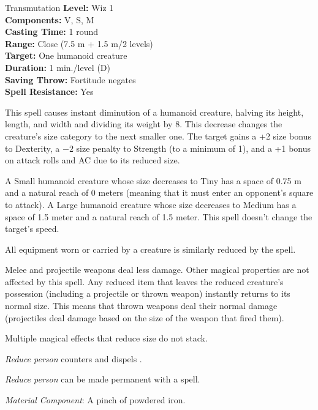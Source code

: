 {Transmutation}
{
	\textbf{Level:}
	Wiz 1\\
	\textbf{Components:}
	V, S, M\\
	\textbf{Casting Time:}
	1 round\\
	\textbf{Range:}
	Close (7.5 m + 1.5 m/2 levels)\\
	\textbf{Target:}
	One humanoid creature\\
	\textbf{Duration:}
	1 min./level (D)\\
	\textbf{Saving Throw:}
	Fortitude negates\\
	\textbf{Spell Resistance:}
	Yes\\
}
{
	This spell causes instant diminution of a humanoid creature, halving its height, length, and width and dividing its weight by 8. This decrease changes the creature's size category to the next smaller one. The target gains a +2 size bonus to Dexterity, a $-2$ size penalty to Strength (to a minimum of 1), and a +1 bonus on attack rolls and AC due to its reduced size.

	A Small humanoid creature whose size decreases to Tiny has a space of 0.75 m and a natural reach of 0 meters (meaning that it must enter an opponent's square to attack). A Large humanoid creature whose size decreases to Medium has a space of 1.5 meter and a natural reach of 1.5 meter. This spell doesn't change the target's speed.

	All equipment worn or carried by a creature is similarly reduced by the spell.

	Melee and projectile weapons deal less damage. Other magical properties are not affected by this spell. Any reduced item that leaves the reduced creature's possession (including a projectile or thrown weapon) instantly returns to its normal size. This means that thrown weapons deal their normal damage (projectiles deal damage based on the size of the weapon that fired them).

	Multiple magical effects that reduce size do not stack.

	\emph{Reduce person} counters and dispels .

	\emph{Reduce person} can be made permanent with a  spell.

	\textit{Material Component}:
	A pinch of powdered iron.

}
